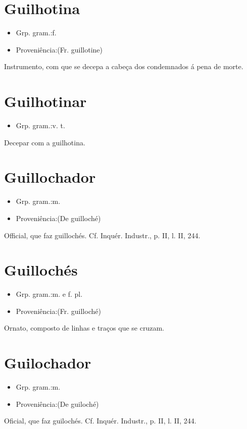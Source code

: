 \section{Guilhotina}
\begin{itemize}
\item {Grp. gram.:f.}
\end{itemize}
\begin{itemize}
\item {Proveniência:(Fr. \textunderscore guillotine\textunderscore )}
\end{itemize}
Instrumento, com que se decepa a cabeça dos condemnados á pena de morte.
\section{Guilhotinar}
\begin{itemize}
\item {Grp. gram.:v. t.}
\end{itemize}
Decepar com a guilhotina.
\section{Guillochador}
\begin{itemize}
\item {Grp. gram.:m.}
\end{itemize}
\begin{itemize}
\item {Proveniência:(De \textunderscore guilloché\textunderscore )}
\end{itemize}
Official, que faz guillochés. Cf. \textunderscore Inquér. Industr.\textunderscore , p. II, l. II, 244.
\section{Guillochés}
\begin{itemize}
\item {Grp. gram.:m.  e  f. pl.}
\end{itemize}
\begin{itemize}
\item {Proveniência:(Fr. \textunderscore guilloché\textunderscore )}
\end{itemize}
Ornato, composto de linhas e traços que se cruzam.
\section{Guilochador}
\begin{itemize}
\item {Grp. gram.:m.}
\end{itemize}
\begin{itemize}
\item {Proveniência:(De \textunderscore guiloché\textunderscore )}
\end{itemize}
Oficial, que faz guilochés. Cf. \textunderscore Inquér. Industr.\textunderscore , p. II, l. II, 244.
